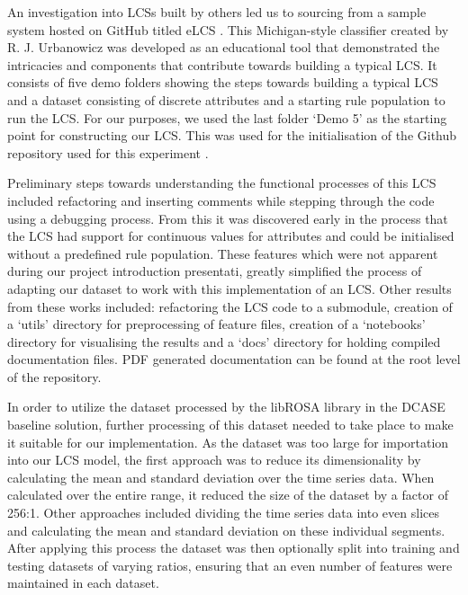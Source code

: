 \documentclass[11pt]{article}
\begin{document}
An investigation into LCSs built by others led us to sourcing from a sample system hosted on GitHub titled eLCS \cite{GHRUELCS2016}. This Michigan-style classifier created by R. J. Urbanowicz was developed as an educational tool that demonstrated the intricacies and components that contribute towards building a typical LCS. It consists of five demo folders showing the steps towards building a typical LCS and a dataset consisting of discrete attributes and a starting rule population to run the LCS. For our purposes, we used the last folder `Demo 5' as the starting point for constructing our LCS. This was used for the initialisation of the Github repository used for this experiment \cite{GHSMCITS44042017}.

Preliminary steps towards understanding the functional processes of this LCS included refactoring and inserting comments while stepping through the code using a debugging process. From this it was discovered early in the process that the LCS had support for continuous values for attributes and could be initialised without a predefined rule population. These features which were not apparent during our project introduction presentati, greatly simplified the process of adapting our dataset to work with this implementation of an LCS. Other results from these works included: refactoring the LCS code to a submodule, creation of a `utils' directory for preprocessing of feature files, creation of a `notebooks' directory for visualising the results and a `docs' directory for holding compiled documentation files. PDF generated documentation can be found at the root level of the repository.

In order to utilize the dataset processed by the libROSA library in the DCASE baseline solution, further processing of this dataset needed to take place to make it suitable for our implementation. As the dataset was too large for importation into our LCS model, the first approach was to reduce its dimensionality by calculating the mean and standard deviation over the time series data. When calculated over the entire range, it reduced the size of the dataset by a factor of 256:1. Other approaches included dividing the time series data into even slices and calculating the mean and standard deviation on these individual segments. After applying this process the dataset was then optionally split into training and testing datasets of varying ratios, ensuring that an even number of features were maintained in each dataset.
\end{document}
